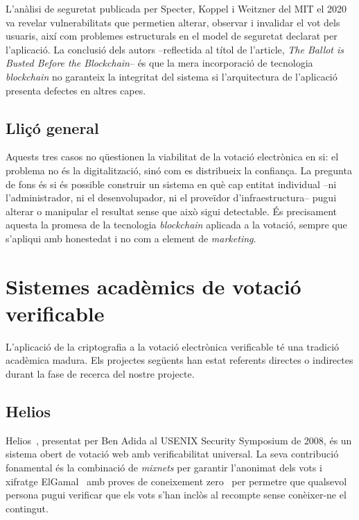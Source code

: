 L'anàlisi de seguretat publicada per Specter, Koppel i Weitzner del MIT el 2020~\cite{specter2020voatz} va revelar
vulnerabilitats que permetien alterar, observar i invalidar el vot dels usuaris, així com problemes estructurals en el
model de seguretat declarat per l'aplicació.
La conclusió dels autors --reflectida al títol de l'article, \emph{The Ballot is Busted Before the Blockchain}-- és que
la mera incorporació de tecnologia \emph{blockchain} no garanteix la integritat del sistema si l'arquitectura de
l'aplicació presenta defectes en altres capes.

\subsection{Lliçó general}\label{subsec:llico-general}

Aquests tres casos no qüestionen la viabilitat de la votació electrònica en si: el problema no és la digitalització,
sinó com es distribueix la confiança.
La pregunta de fons és si és possible construir un sistema en què cap entitat individual --ni l'administrador, ni el
desenvolupador, ni el proveïdor d'infraestructura-- pugui alterar o manipular el resultat sense que això sigui
detectable.
És precisament aquesta la promesa de la tecnologia \emph{blockchain} aplicada a la votació, sempre que s'apliqui amb
honestedat i no com a element de \emph{marketing}.



\section{Sistemes acadèmics de votació verificable}
\label{sec:sistemes-academics}

L'aplicació de la criptografia a la votació electrònica verificable té una tradició acadèmica madura.
Els projectes següents han estat referents directes o indirectes durant la fase de recerca del nostre projecte.

\subsection{Helios}
\label{subsec:helios}

Helios~\cite{adida2008helios}, presentat per Ben Adida al USENIX Security Symposium de 2008, és un sistema obert de
votació web amb verificabilitat universal.
La seva contribució fonamental és la combinació de \emph{mixnets} per garantir l'anonimat dels vots i xifratge ElGamal~\cite{elgamal1985public}
amb proves de coneixement zero~\cite{goldwasser1989knowledge} per permetre que qualsevol persona pugui verificar que els vots s'han inclòs al recompte
sense conèixer-ne el contingut.

